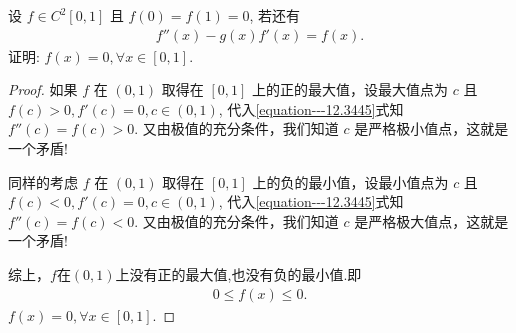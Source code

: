 \documentclass[../../main.tex]{subfiles}
\begin{document}
\begin{example}
设 $f\in C^2[0,1]$ 且 $f(0)=f(1)=0$, 若还有
\begin{align}
f''(x)-g(x)f'(x)=f(x).
\label{equation---12.3445}
\end{align}
证明:
$f(x)=0,\forall x\in[0,1]$.
\end{example}
\begin{proof}
如果 $f$ 在 $(0,1)$ 取得在 $[0,1]$ 上的正的最大值，设最大值点为 $c$ 且 $f(c)>0,f'(c)=0,c\in(0,1)$, 代入\eqref{equation---12.3445}式知 $f''(c)=f(c)>0$. 又由极值的充分条件，我们知道 $c$ 是严格极小值点，这就是一个矛盾!

同样的考虑 $f$ 在 $(0,1)$ 取得在 $[0,1]$ 上的负的最小值，设最小值点为 $c$ 且 $f(c)<0,f'(c)=0,c\in(0,1)$, 代入\eqref{equation---12.3445}式知 $f''(c)=f(c)<0$. 又由极值的充分条件，我们知道 $c$ 是严格极大值点，这就是一个矛盾!

综上，$f$在$(0,1)$上没有正的最大值,也没有负的最小值.即
\begin{align*}
0\leqslant f(x)\leqslant0.
\end{align*}
$f(x)=0,\forall x\in[0,1]$. 
\end{proof}
\end{document}
